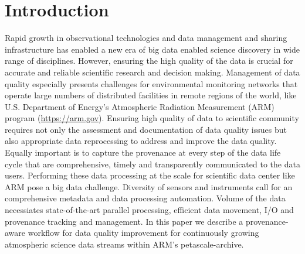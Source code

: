 \section{Introduction}
Rapid growth in observational technologies and data management and
sharing infrastructure has enabled a new era of big data enabled science
discovery in wide range of disciplines. However, ensuring the high
quality of the data is crucial for accurate and reliable scientific
research and decision making. Management of data quality especially
presents challenges for environmental monitoring networks that operate
large numbers of distributed facilities in remote regions of the world,
like U.S. Department of Energy's Atmospheric Radiation Measurement (ARM)
program (\url{https://arm.gov}). Ensuring high quality of data to
scientific community requires not only  the assessment and
documentation of data quality issues but also appropriate data reprocessing to
address and improve the data quality.
Equally important is to capture the provenance at every step of
the data life cycle that are comprehensive, timely and transparently
communicated to the data users.
Performing these data processing at the scale for scientific data center
like ARM pose a big data challenge. Diversity of sensors and instruments
call for an comprehensive metadata and data processing automation.
Volume of the data necessiates state-of-the-art parallel processing,
efficient data movement, I/O and provenance tracking and management.
In this paper we describe a provenance-aware workflow for
data quality improvement for continuously growing
atmospheric science data streams within ARM's petascale-archive.


